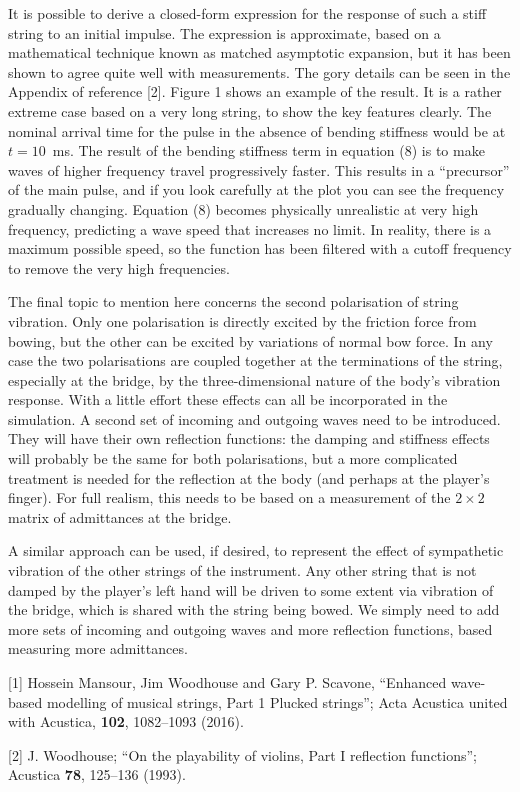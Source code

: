   It is possible to derive a closed-form expression for the response of such a 
  stiff string to an initial impulse. The expression is approximate, based on a 
  mathematical technique known as matched asymptotic expansion, but it has been 
  shown to agree quite well with measurements. The gory details can be seen in 
  the Appendix of reference [2]. Figure 1 shows an example of the result. It is 
  a rather extreme case based on a very long string, to show the key features 
  clearly. The nominal arrival time for the pulse in the absence of bending 
  stiffness would be at $t=10$~ms. The result of the bending stiffness term in 
  equation (8) is to make waves of higher frequency travel progressively 
  faster. This results in a ``precursor'' of the main pulse, and if you look 
  carefully at the plot you can see the frequency gradually changing. Equation 
  (8) becomes physically unrealistic at very high frequency, predicting a wave 
  speed that increases no limit. In reality, there is a maximum possible speed, 
  so the function has been filtered with a cutoff frequency to remove the very 
  high frequencies. 


  The final topic to mention here concerns the second polarisation of string 
  vibration. Only one polarisation is directly excited by the friction force 
  from bowing, but the other can be excited by variations of normal bow force. 
  In any case the two polarisations are coupled together at the terminations of 
  the string, especially at the bridge, by the three-dimensional nature of the 
  body’s vibration response. With a little effort these effects can all be 
  incorporated in the simulation. A second set of incoming and outgoing waves 
  need to be introduced. They will have their own reflection functions: the 
  damping and stiffness effects will probably be the same for both 
  polarisations, but a more complicated treatment is needed for the reflection 
  at the body (and perhaps at the player's finger). For full realism, this 
  needs to be based on a measurement of the $2 \times 2$ matrix of admittances 
  at the bridge. 

  A similar approach can be used, if desired, to represent the effect of 
  sympathetic vibration of the other strings of the instrument. Any other 
  string that is not damped by the player's left hand will be driven to some 
  extent via vibration of the bridge, which is shared with the string being 
  bowed. We simply need to add more sets of incoming and outgoing waves and 
  more reflection functions, based measuring more admittances. 

  \sectionreferences{}[1] Hossein Mansour, Jim Woodhouse and Gary P. Scavone, 
  “Enhanced wave-based modelling of musical strings, Part 1 Plucked strings”; 
  Acta Acustica united with Acustica, \textbf{102}, 1082–1093 (2016). 

  [2] J. Woodhouse; “On the playability of violins, Part I reflection 
  functions”; Acustica \textbf{78}, 125–136 (1993). 